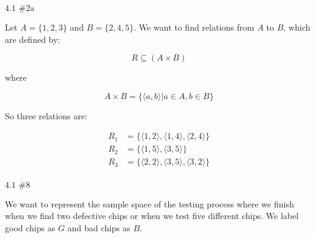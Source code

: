 \documentclass{article}
\newcommand{\problem}[2]{$\boxed{\text{#1 \##2}}$}
\newcommand{\solution}[1]{\boxed{#1}}
\newcommand{\multistep}[1]{\begin{array}{rl} #1 \end{array}}
\begin{document}
%
\problem{4.1}{2a}

Let $A=\{1,2,3\}$ and $B=\{2,4,5\}$. We want to find relations from
$A$ to $B$, which are defined by:

\[
R\subseteq (A\times B)
\]

where

\[
A\times B=\{\langle a,b\rangle|a\in A,b\in B\}
\]

So three relations are:

\[
\solution{
\multistep{
R_1&=\{\langle 1,2\rangle, \langle 1,4\rangle, \langle 2,4\rangle\} \\
R_2&=\{\langle 1,5\rangle, \langle 3,5\rangle\} \\
R_3&=\{\langle 2,2\rangle, \langle 3,5\rangle,\langle 3,2\rangle\} \\
}
}
\]

%
\problem{4.1}{8}

We want to represent the sample space of the testing process where we
finish when we find two defective chips or when we test five different
chips. We label good chips as $G$ and bad chips as $B$.

\end{document}
